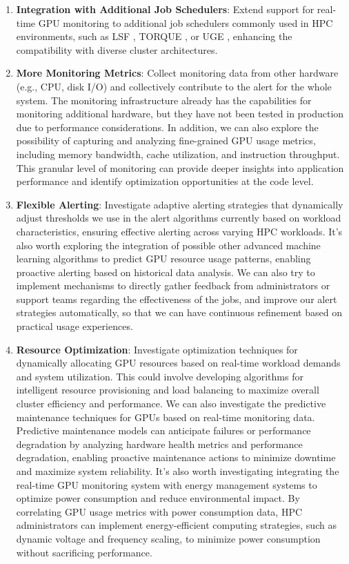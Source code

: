 \begin{enumerate}
    \item \textbf{Integration with Additional Job Schedulers}: Extend support for real-time GPU monitoring to additional job schedulers commonly used in HPC environments, such as LSF \cite{10.1145/3569951.3597564}, TORQUE \cite{10.1145/1188455.1188464}, or UGE \cite{10.1145/3332186.3338408}, enhancing the compatibility with diverse cluster architectures.
    \item \textbf{More Monitoring Metrics}: Collect monitoring data from other hardware (e.g., CPU, disk I/O) and collectively contribute to the alert for the whole system. The monitoring infrastructure already has the capabilities for monitoring additional hardware, but they have not been tested in production due to performance considerations. In addition, we can also explore the possibility of capturing and analyzing fine-grained GPU usage metrics, including memory bandwidth, cache utilization, and instruction throughput. This granular level of monitoring can provide deeper insights into application performance and identify optimization opportunities at the code level.
    \item \textbf{Flexible Alerting}: Investigate adaptive alerting strategies that dynamically adjust thresholds we use in the alert algorithms currently based on workload characteristics, ensuring effective alerting across varying HPC workloads. It's also worth exploring the integration of possible other advanced machine learning algorithms to predict GPU resource usage patterns, enabling proactive alerting based on historical data analysis. We can also try to implement mechanisms to directly gather feedback from administrators or support teams regarding the effectiveness of the jobs, and improve our alert strategies automatically, so that we can have continuous refinement based on practical usage experiences.
    \item \textbf{Resource Optimization}: Investigate optimization techniques for dynamically allocating GPU resources based on real-time workload demands and system utilization. This could involve developing algorithms for intelligent resource provisioning and load balancing to maximize overall cluster efficiency and performance. We can also investigate the predictive maintenance techniques for GPUs based on real-time monitoring data. Predictive maintenance models can anticipate failures or performance degradation by analyzing hardware health metrics and performance degradation, enabling proactive maintenance actions to minimize downtime and maximize system reliability. It's also worth investigating integrating the real-time GPU monitoring system with energy management systems to optimize power consumption and reduce environmental impact. By correlating GPU usage metrics with power consumption data, HPC administrators can implement energy-efficient computing strategies, such as dynamic voltage and frequency scaling, to minimize power consumption without sacrificing performance.
\end{enumerate}
